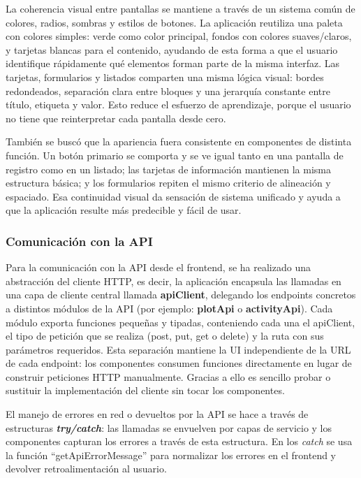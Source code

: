 La coherencia visual entre pantallas se mantiene a través de un sistema común de colores, radios, sombras y estilos de botones. La aplicación reutiliza una paleta con colores simples: verde como color principal, fondos con colores suaves/claros, y tarjetas blancas
para el contenido, ayudando de esta forma a que el usuario identifique rápidamente qué elementos forman parte de la misma interfaz. Las tarjetas, formularios y listados comparten una misma lógica visual: bordes redondeados, separación clara entre bloques y una 
jerarquía constante entre título, etiqueta y valor. Esto reduce el esfuerzo de aprendizaje, porque el usuario no tiene que reinterpretar cada pantalla desde cero.

También se buscó que la apariencia fuera consistente en componentes de distinta función. Un botón primario se comporta y se ve igual tanto en una pantalla de registro como en un listado; las tarjetas de información mantienen la misma estructura básica; y los formularios 
repiten el mismo criterio de alineación y espaciado. Esa continuidad visual da sensación de sistema unificado y ayuda a que la aplicación resulte más predecible y fácil de usar.

\subsubsection{Comunicación con la API}

Para la comunicación con la API desde el frontend, se ha realizado una abstracción del cliente HTTP, es decir, la aplicación encapsula las llamadas en una capa de cliente central llamada \textbf{apiClient}, delegando los endpoints concretos a distintos módulos de la API
(por ejemplo: \textbf{plotApi} o \textbf{activityApi}). Cada módulo exporta funciones pequeñas y tipadas, conteniendo cada una el apiClient, el tipo de petición que se realiza (post, put, get o delete) y la ruta con sus parámetros requeridos. Esta separación mantiene la 
UI independiente de la URL de cada endpoint: los componentes consumen funciones directamente en lugar de construir peticiones HTTP manualmente. Gracias a ello es sencillo probar o sustituir la implementación del cliente sin tocar los componentes.

El manejo de errores en red o devueltos por la API se hace a través de estructuras \textit{\textbf{try/catch}}: las llamadas se envuelven por capas de servicio y los componentes capturan los errores a través de esta estructura. En los \textit{catch} se usa la función 
``getApiErrorMessage'' para normalizar los errores en el frontend y devolver retroalimentación al usuario.

